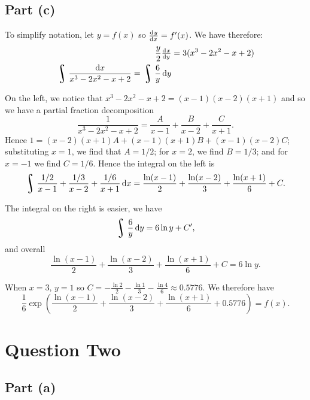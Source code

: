 \documentclass[a4paper]{report}
\DeclareMathOperator*{\rint}{\scalerel*{\rotatebox{17}{$\!\int\!$}}{\int}}
\begin{document}
\subsection*{Part (c)}
To simplify notation, let $ y = f(x) $ so $ \od{y}{x} = f'(x) $. We have therefore:
\begin{align*}
  \frac{y}{2} \od{x}{y} &= 3(x^3 - 2x^2 - x + 2)\\
  \rint \frac{\dif{x}}{x^3 - 2x^2 - x + 2} = \rint \frac{6}{y} \dif{y}
\end{align*}

On the left, we notice that $ x^3 - 2x^2 - x + 2 = (x-1)(x-2)(x+1) $ and so we have a partial fraction decomposition
\begin{displaymath}
  \frac{1}{x^3 - 2x^2 - x + 2} = \frac{A}{x - 1} + \frac{B}{x - 2} + \frac{C}{x + 1}.
\end{displaymath}
Hence $ 1 = (x - 2)(x + 1)A + (x - 1)(x + 1)B + (x - 1)(x - 2)C $; substituting $ x = 1 $, we find that $ A = 1/2 $; for $ x = 2 $,
we find $ B = 1/3 $; and for $ x = -1 $ we find $ C = 1/6 $. Hence the integral on the left is
\begin{displaymath}
  \rint \frac{1/2}{x - 1} + \frac{1/3}{x - 2} + \frac{1/6}{x + 1} \dif{x} = \frac{\ln(x - 1)}{2} + \frac{\ln(x - 2)}{3} + \frac{\ln(x + 1)}{6} + C.
\end{displaymath}

The integral on the right is easier, we have
\begin{displaymath}
  \rint \frac{6}{y} \dif{y} = 6\ln y + C',
\end{displaymath}
and overall
\begin{displaymath}
  \frac{\ln(x - 1)}{2} + \frac{\ln(x - 2)}{3} + \frac{\ln(x + 1)}{6} + C = 6\ln y.
\end{displaymath}

When $ x = 3 $, $ y = 1 $ so $ C = - \frac{\ln 2}{2} - \frac{\ln 1}{3} - \frac{\ln 4}{6} \approx 0.5776 $. We therefore have
\begin{displaymath}
  \frac{1}{6}\exp\left(\frac{\ln(x - 1)}{2} + \frac{\ln(x - 2)}{3} + \frac{\ln(x + 1)}{6} + 0.5776 \right) = f(x).
\end{displaymath}

\section*{Question Two}
\subsection*{Part (a)}
\end{document}
